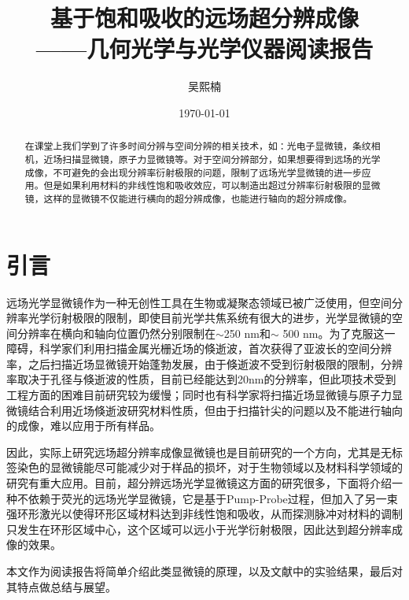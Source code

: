 \documentclass{phyasgn}\usepackage{nag}
\title{
  {基于饱和吸收的远场超分辨成像}\\[-8pt]
  {\normalsize ——几何光学与光学仪器阅读报告}
}
\author{吴熙楠}
\date{\today}
\begin{document}
\maketitle

\begin{abstract}
在课堂上我们学到了许多时间分辨与空间分辨的相关技术，如：光电子显微镜，条纹相机，近场扫描显微镜，原子力显微镜等。对于空间分辨部分，如果想要得到远场的光学成像，不可避免的会出现分辨率衍射极限的问题，限制了远场光学显微镜的进一步应用。但是如果利用材料的非线性饱和吸收效应，可以制造出超过分辨率衍射极限的显微镜，这样的显微镜不仅能进行横向的超分辨成像，也能进行轴向的超分辨成像。
\end{abstract}

\tableofcontents

\section{引言}
远场光学显微镜作为一种无创性工具在生物或凝聚态领域已被广泛使用，但空间分辨率光学衍射极限的限制，即使目前光学共焦系统有很大的进步，光学显微镜的空间分辨率在横向和轴向位置仍然分别限制在$\sim$250 nm和$\sim$ 500 nm。为了克服这一障碍，科学家们利用扫描金属光栅近场的倏逝波，首次获得了亚波长的空间分辨率\cite{ash1972super}，之后扫描近场显微镜开始蓬勃发展，由于倏逝波不受到衍射极限的限制，分辨率取决于孔径与倏逝波的性质，目前已经能达到20nm的分辨率\cite{doi:10.1063/1.336848}，但此项技术受到工程方面的困难目前研究较为缓慢；同时也有科学家将扫描近场显微镜与原子力显微镜结合利用近场倏逝波研究材料性质\cite{BETZIG1986269}，但由于扫描针尖的问题以及不能进行轴向的成像，难以应用于所有样品。
\par 因此，实际上研究远场超分辨率成像显微镜也是目前研究的一个方向，尤其是无标签染色的显微镜能尽可能减少对于样品的损坏，对于生物领域以及材料科学领域的研究有重大应用。目前，超分辨远场光学显微镜这方面的研究很多，下面将介绍一种不依赖于荧光的远场光学显微镜，它是基于Pump-Probe过程，但加入了另一束强环形激光以使得环形区域材料达到非线性饱和吸收，从而探测脉冲对材料的调制只发生在环形区域中心，这个区域可以远小于光学衍射极限，因此达到超分辨率成像的效果。
\par 本文作为阅读报告将简单介绍此类显微镜的原理，以及文献\cite{doi:10.1021/acs.nanolett.1c00403,wang2013far,Bi:20,doi:10.1021/acsphotonics.9b01821}中的实验结果，最后对其特点做总结与展望。
\end{document}

